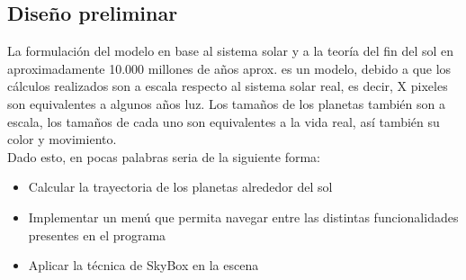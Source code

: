 \documentclass[12pt,journal,compsoc]{IEEEtran}
\begin{document}
\subsection{Diseño preliminar}
La formulación del modelo en base al sistema solar y a la teoría del fin del sol en aproximadamente 10.000 millones de años aprox. es un modelo, debido a que los cálculos realizados son a escala respecto al sistema solar real, es decir, X pixeles son equivalentes a algunos años luz. Los tamaños de los planetas también son a escala, los tamaños de cada uno son equivalentes a la vida real, así también su color y movimiento.
\\
Dado esto, en pocas palabras seria de la siguiente forma:
\begin{itemize}
 \item Calcular la trayectoria de los planetas alrededor del sol
 \item Implementar un menú que permita navegar entre las
 distintas funcionalidades presentes en el programa
 \item Aplicar la técnica de SkyBox en la escena
\end{itemize}
\end{document}
